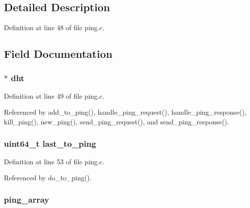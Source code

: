 \subsection{Detailed Description}


Definition at line 48 of file ping.\+c.



\subsection{Field Documentation}
\hypertarget{struct_p_i_n_g_a8b3d6ce8745acc52695e252bdb1531b6}{
\subsubsection[{dht}]{$\ast$ dht}}\label{struct_p_i_n_g_a8b3d6ce8745acc52695e252bdb1531b6}


Definition at line 49 of file ping.\+c.



Referenced by add\+\_\+to\+\_\+ping(), handle\+\_\+ping\+\_\+request(), handle\+\_\+ping\+\_\+response(), kill\+\_\+ping(), new\+\_\+ping(), send\+\_\+ping\+\_\+request(), and send\+\_\+ping\+\_\+response().

\hypertarget{struct_p_i_n_g_afc22124d671081ed5b12fc2fa71801d3}{
\subsubsection[{last\+\_\+to\+\_\+ping}]{\setlength{\rightskip}{0pt plus 5cm}uint64\+\_\+t last\+\_\+to\+\_\+ping}}\label{struct_p_i_n_g_afc22124d671081ed5b12fc2fa71801d3}


Definition at line 53 of file ping.\+c.



Referenced by do\+\_\+to\+\_\+ping().

\hypertarget{struct_p_i_n_g_afb64d37a183969be553d23416dc47a4b}{
\subsubsection[{ping\+\_\+array}]{ ping\+\_\+array}}\label{struct_p_i_n_g_afb64d37a183969be553d23416dc47a4b}


